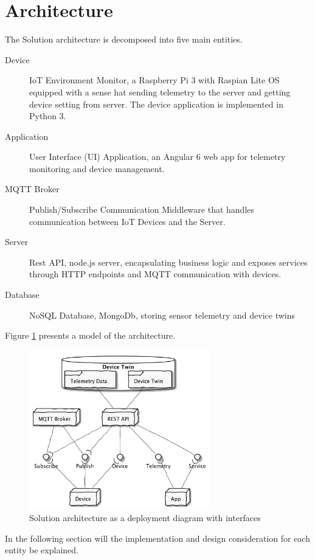 \section{Architecture}

The Solution architecture is decomposed into five main entities. 
\begin{description}
    \item[Device] IoT Environment Monitor, a Raspberry Pi 3 with Raspian Lite OS equipped with a sense hat sending telemetry to the server and getting device setting from server. The device application is implemented in Python 3.
    \item[Application] User Interface (UI) Application, an Angular 6 web app for telemetry monitoring and device management.
    \item[MQTT Broker] Publish/Subscribe Communication Middleware that handles communication between IoT Devices and the Server.
    \item[Server] Rest API, node.js server, encapsulating business logic and exposes services through HTTP endpoints and MQTT communication with devices.
    \item[Database] NoSQL Database, MongoDb, storing sensor telemetry and device twins 
\end{description}
Figure \ref{fig:arc} presents a model of the architecture.

\begin{figure}[H]
    \centering
    \includegraphics[width=0.7\textwidth]{out/figures/uml/architecture/architecture.png}
    \caption{Solution architecture as a deployment diagram with interfaces}
    \label{fig:arc}
\end{figure}

In the following section will the implementation and design consideration for each entity be explained. 